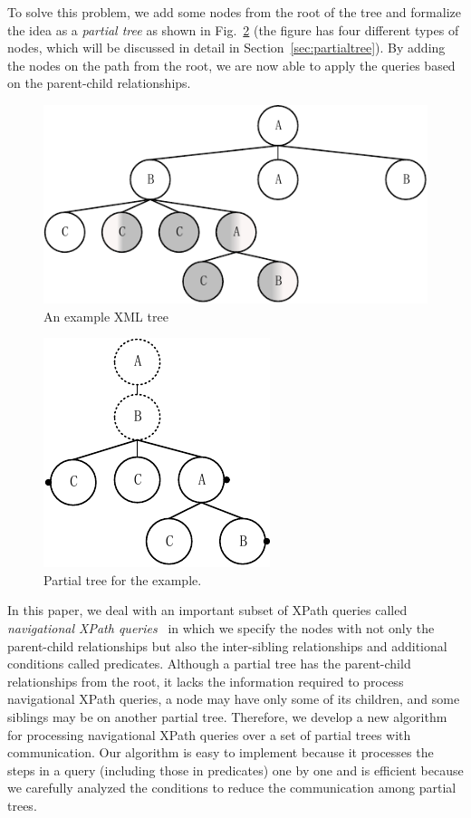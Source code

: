 To solve this problem, we add some nodes from the root of the tree and
formalize the idea as a \emph{partial tree} as shown in
Fig.~\ref{fig:partialtree} (the figure has four different types of
nodes, which will be discussed in detail in
Section~\ref{sec:partialtree}).  
By adding the nodes on the path from the root, we are now able to apply
the queries based on the parent-child relationships.  

\begin{figure}[t]
\centering\includegraphics{partialtree/figures/fromWord-1.pdf}
\caption{An example XML tree}
\label{fig:example}
\end{figure}

\begin{figure}[t]
\centering\includegraphics{partialtree/figures/fromWord-3.pdf}
\caption{Partial tree for the example.}
\label{fig:partialtree}
\end{figure}

In this paper, we deal with an important subset of XPath queries called
\emph{navigational XPath queries}~\cite{xpathcategory} in which we specify the nodes with not only
the parent-child relationships but also the inter-sibling relationships
and additional conditions called predicates.  Although a partial tree has
the parent-child relationships from the root, it lacks the information
required to process navigational XPath queries, a node may have only some
of its children, and some siblings may be on another partial tree.
Therefore, we develop a new algorithm for processing navigational XPath
queries over a set of partial trees with communication.
Our algorithm is easy to implement because it processes the steps in a query (including those in predicates) 
one by one and is efficient because we carefully analyzed the conditions to reduce the communication among partial trees.

